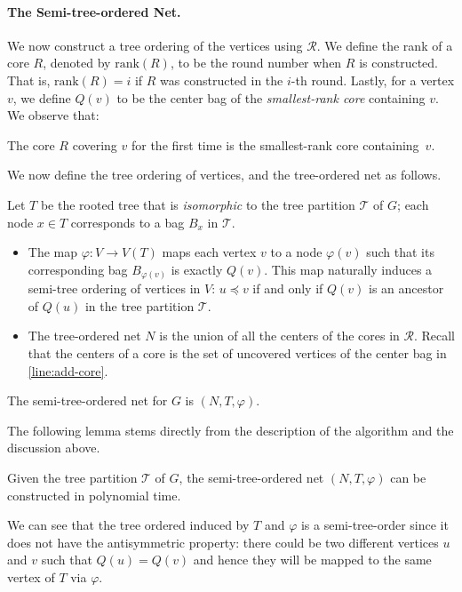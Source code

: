 \documentclass{theoretics}
\newcommand{\mt}{\mathcal{T}}
\newcommand{\rank}{\mathrm{rank}}
\def\coreSet{\mathcal{R}}
\def\core{R}
\begin{document}
\paragraph*{The Semi-tree-ordered Net.~} We now construct a tree ordering of the vertices using $\coreSet$.   We define the rank of a core $\core$, denoted by $\rank(\core)$, to be the round number when $\core$ is constructed. That is, $\rank(\core) =i$ if $\core$ was constructed in the $i$-th round.  Lastly, for a vertex $v$, we define $Q(v)$ to be the center bag of the \emph{smallest-rank core} containing $v$. We observe that:
\begin{observation}\label{obs:smallest-rank}
	The core $R$ covering $v$ for the first time is the smallest-rank core containing~$v$.
\end{observation}
We now define the tree ordering of vertices, and the tree-ordered net as follows. 

\begin{definition}\label{def:vertexOrdering}
Let $T$ be the rooted tree that is \emph{isomorphic} to the tree partition $\mathcal{T}$ of $G$; each node $x\in T$ corresponds to a bag $B_x$ in $\mathcal{T}$. 
        \begin{itemize}
		\item  The map $\varphi: V\rightarrow V(T)$ maps each vertex $v$ to a node $\varphi(v)$ such that its corresponding bag $B_{\varphi(v)}$ is exactly $Q(v)$. This map naturally induces a semi-tree ordering of vertices in $V$:   $u \preceq v$ if and only if $Q(v)$ is an ancestor of $Q(u)$ in the tree partition $\mathcal{T}$.
		\item  The tree-ordered net $N$ is the union of all the centers of the cores in $\coreSet$. Recall that the centers of a core is the set of uncovered vertices of the center bag in \cref{line:add-core}. 
	\end{itemize}
	The semi-tree-ordered net for $G$ is $(N, T, \varphi)$. 
\end{definition}

 The following lemma stems directly from the description of the algorithm and the discussion above.


\begin{lemma}
	\label{lem:vertexIsInCore}
	Given the tree partition $\mt$ of $G$, the semi-tree-ordered net $(N,T,\varphi)$ can be constructed in polynomial time.
\end{lemma}

We can see that the tree ordered induced by $T$ and  $\varphi$ is a semi-tree-order since it does not have the antisymmetric property: there could be two different vertices $u$ and $v$ such that $Q(u) = Q(v)$ and hence they will be mapped to the same vertex of $T$ via $\varphi$.  
\end{document}
